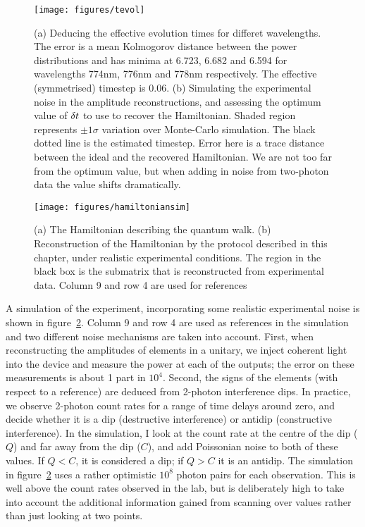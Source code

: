\begin{figure}
  \centering
  \texttt{[image: figures/tevol]}
  \caption[Deducing the effective evolution times for different wavelengths]
  {(a) Deducing the effective evolution times for differet wavelengths. The
  error is a mean Kolmogorov distance between the power distributions and has
  minima at 6.723, 6.682 and 6.594 for wavelengths 774nm, 776nm and 778nm
  respectively. The effective (symmetrised) timestep is 0.06. (b) Simulating the
  experimental noise in the amplitude reconstructions, and assessing the optimum
  value of \(\delta t\) to use to recover the Hamiltonian. Shaded region represents
  \(\pm 1 \sigma\) variation over Monte-Carlo simulation. The black dotted line
  is the estimated timestep. Error here is a trace distance between the ideal
  and the recovered Hamiltonian. We are not too far from the optimum value, but
  when adding in noise from two-photon data the value shifts dramatically.}
  \label{fig:tevol}
\end{figure}

\begin{figure}
  \centering
  \texttt{[image: figures/hamiltoniansim]}
  \caption[Simulation of the Hamiltonian tomography under experimental noise]
  {(a) The Hamiltonian describing the quantum walk. (b) Reconstruction of 
  the Hamiltonian by the protocol described in this chapter, under realistic
  experimental conditions. The region in the black box is the submatrix that is
  reconstructed from experimental data. Column 9 and row 4 are used for
  references}
  \label{fig:hamiltoniansim}
\end{figure}

A simulation of the experiment, incorporating some realistic experimental noise
is shown in figure~\ref{fig:hamiltoniansim}. Column 9 and row 4 are used as
references in the simulation and two different noise mechanisms are
taken into account. First, when reconstructing the amplitudes of elements in a
unitary, we inject coherent light into the device and measure the power at each
of the outputs; the error on these measurements is about 1 part in \(10^{4}\).
Second, the signs of the elements (with respect to a reference) are deduced from
2-photon interference dips. In practice, we observe 2-photon count rates for a
range of time delays around zero, and decide whether it is a dip (destructive
interference) or antidip (constructive interference). In the simulation, I look
at the count rate at the centre of the dip (\(Q\)) and far away from the dip
(\(C\)), and add Poissonian noise to both of these values. If \(Q<C\), it is
considered a dip; if \(Q>C\) it is an antidip. The simulation in
figure~\ref{fig:hamiltoniansim} uses a rather optimistic \(10^{8}\) photon pairs
for each observation. This is well above the count rates observed in the lab,
but is deliberately high to take into account the additional information gained
from scanning over values rather than just looking at two points.

